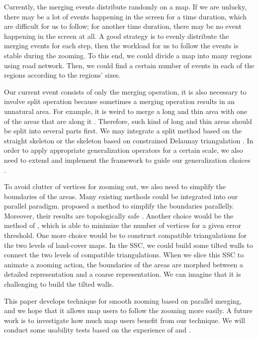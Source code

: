 \documentclass[ijgi,article,submit,moreauthors,pdftex]{Definitions/mdpi}
\begin{document}
Currently, the merging events distribute randomly on a map.
If we are unlucky, there may be a lot of events happening in the screen 
for a time duration,
which are difficult for us to follow;
for another time duration, there may be no event happening in the screen at all.
A good strategy is to evenly distribute the merging events for each step, 
then the workload for us to follow the events is stable during the zooming.
To this end, we could divide a map into many regions using road network.
Then, we could find a certain number of events in each of the regions according to
the regions' sizes.


Our current event consists of only the merging operation,
it is also necessary to involve split operation
because sometimes a merging operation results in an unnatural area.
For example, it is weird to merge a long and thin area 
with one of the areas that are along it
\citep[see][]{Haunert2008Skeleton}.
Therefore, such kind of long and thin areas should be
split into several parts first.
We may integrate a split method based on the straight skeleton
\citep{Haunert2008Skeleton}
or the skeleton based on constrained Delaunay triangulation
\citep{Meijers2016Split}.
In order to apply appropriate generalization operators
for a certain scale,
we also need to extend and implement the framework 
to guide our generalization choices
\citep{Meijers2018Framework}.

To avoid clutter of vertices for zooming out, 
we also need to simplify the boundaries of the areas.
Many existing methods could be integrated into our parallel paradigm.
\citet{Meijers2011LineSimp} proposed a method 
to simplify the boundaries parallelly. 
Moreover, their results are topologically safe . 
Another choice would be the method of \citet{ImaiIri1988},
which is able to minimize the number of vertices 
for a given error threshold.
One more choice would be to construct compatible triangulations 
\citep[see][]{Peng2019Thesis}
for the two levels of land-cover maps.
In the SSC, we could build some tilted walls 
to connect the two levels of compatible triangulations.
When we slice this SSC to animate a zooming action,
the boundaries of the areas are morphed 
between a detailed representation and a coarse representation.
We can imagine that it is challenging to build the tilted walls.

This paper develops technique for smooth zooming based on parallel merging,
and we hope that it allows map users to follow the zooming more easily.
A future work is to investigate 
how much map users benefit from our technique.
We will conduct some usability tests based on the experience of
\citet[]{Suba2017Thesis} and \citet{Midtbo2007}.
\end{document}
